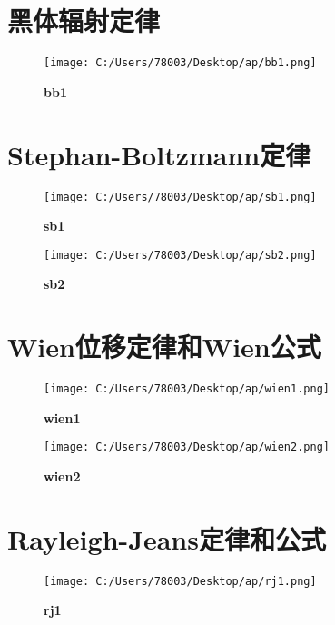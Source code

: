 \documentclass[UTF8]{report}
\theoremstyle{MyLineTheoremStyle} %
\theoremstyle{MyBlockTheoremStyle} %
\theoremstyle{MySubsubsectionStyle} %
\begin{document}
\cleardoublepage
\section{黑体辐射定律}

\begin{figure}[ht]
    \centering
    \texttt{[image: C:/Users/78003/Desktop/ap/bb1.png]}
    \caption{\textbf{bb1}}
    \label{fig:bb1}
\end{figure}

\cleardoublepage
\section{Stephan-Boltzmann定律}

\begin{figure}[ht]
    \centering
    \texttt{[image: C:/Users/78003/Desktop/ap/sb1.png]}
    \caption{\textbf{sb1}}
    \label{fig:sb1}
\end{figure}

\begin{figure}[ht]
    \centering
    \texttt{[image: C:/Users/78003/Desktop/ap/sb2.png]}
    \caption{\textbf{sb2}}
    \label{fig:sb2}
\end{figure}

\cleardoublepage
\section{Wien位移定律和Wien公式}

\begin{figure}[ht]
    \centering
    \texttt{[image: C:/Users/78003/Desktop/ap/wien1.png]}
    \caption{\textbf{wien1}}
    \label{fig:wien1}
\end{figure}

\begin{figure}[ht]
    \centering
    \texttt{[image: C:/Users/78003/Desktop/ap/wien2.png]}
    \caption{\textbf{wien2}}
    \label{fig:wien2}
\end{figure}

\cleardoublepage
\section{Rayleigh-Jeans定律和公式}

\begin{figure}[ht]
    \centering
    \texttt{[image: C:/Users/78003/Desktop/ap/rj1.png]}
    \caption{\textbf{rj1}}
    \label{fig:rj1}
\end{figure}
\end{document}
